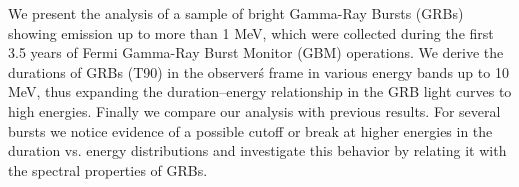 


\bigskip



\bigskip

\noindent We present the analysis of a sample of bright Gamma-Ray Bursts (GRBs) showing emission up to more than 1 MeV, which were collected during the first 3.5 years of Fermi Gamma-Ray Burst Monitor (GBM) operations.
We derive the durations of GRBs (T90) in the observer\'s frame in various energy bands up to 10 MeV, thus expanding the duration–energy relationship in the GRB light curves to high energies. Finally we compare our analysis with previous results.
For several bursts we notice evidence of a possible cutoff or break at higher energies in the duration vs. energy distributions and investigate this
behavior by relating it with the spectral properties of GRBs.


